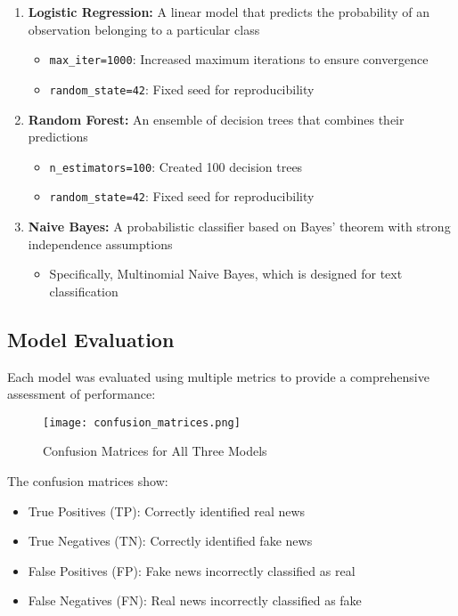 \documentclass[12pt]{article}
\begin{document}
\begin{enumerate}
    \item \textbf{Logistic Regression:} A linear model that predicts the probability of an observation belonging to a particular class
    \begin{itemize}
        \item \texttt{max\_iter=1000}: Increased maximum iterations to ensure convergence
        \item \texttt{random\_state=42}: Fixed seed for reproducibility
    \end{itemize}
    
    \item \textbf{Random Forest:} An ensemble of decision trees that combines their predictions
    \begin{itemize}
        \item \texttt{n\_estimators=100}: Created 100 decision trees
        \item \texttt{random\_state=42}: Fixed seed for reproducibility
    \end{itemize}
    
    \item \textbf{Naive Bayes:} A probabilistic classifier based on Bayes' theorem with strong independence assumptions
    \begin{itemize}
        \item Specifically, Multinomial Naive Bayes, which is designed for text classification
    \end{itemize}
\end{enumerate}

\subsection{Model Evaluation}

Each model was evaluated using multiple metrics to provide a comprehensive assessment of performance:

\begin{figure}[h]
    \centering
    \texttt{[image: confusion\_matrices.png]}
    \caption{Confusion Matrices for All Three Models}
\end{figure}

The confusion matrices show:
\begin{itemize}
    \item True Positives (TP): Correctly identified real news
    \item True Negatives (TN): Correctly identified fake news
    \item False Positives (FP): Fake news incorrectly classified as real
    \item False Negatives (FN): Real news incorrectly classified as fake
\end{itemize}
\end{document}
